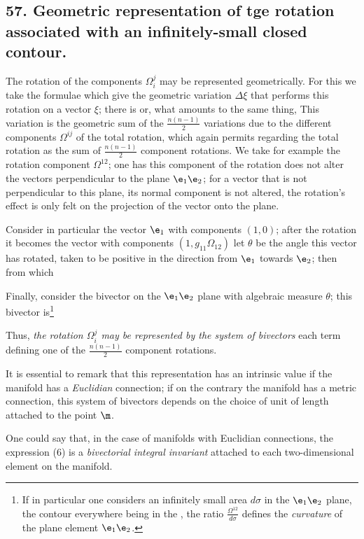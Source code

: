 \subsection*{57. Geometric representation of tge rotation associated with an infinitely-small closed contour.}

The rotation of the components $\Omega_i^j$ may be represented geometrically. For this we take the formulae which give the geometric variation $\Delta\xi$ that performs this rotation on a vector $\xi$; there is
or, what amounts to the same thing,
This variation is the geometric sum of the $\frac{n(n-1)}{2}$ variations due to the different components $\Omega^{ij}$ of the total rotation, which again permits regarding the total rotation as the sum of $\frac{n(n-1)}{2}$ component rotations. We take for example the rotation component $\Omega^{12}$; one has
this component of the rotation does not alter the vectors perpendicular to the plane $\e_1\e_2$; for a vector that is not perpendicular to this plane, its normal component is not altered, the rotation's effect is only felt on the projection of the vector onto the plane.

Consider in particular the vector $\e_1$ with components $(1,0)$; after the rotation it becomes the vector with components $(1, g_{11}\Omega_{12})$
let $\theta$ be the angle this vector has rotated, taken to be positive in the direction from $\e_1$ towards $\e_2$; then
from which

Finally, consider the bivector on the $\e_1\e_2$ plane with algebraic measure $\theta$; this bivector is\footnote{If in particular one considers an infinitely small area $d\sigma$ in the $\e_1\e_2$ plane, the contour everywhere being in the , the ratio $\frac{\Omega^{12}}{d\sigma}$ defines the \textit{curvature} of the plane element $\e_1\e_2$.}

Thus, \textit{the rotation $\Omega_i^j$ may be represented by the system of bivectors}
each term defining one of the $\frac{n(n-1)}{2}$ component rotations.

It is essential to remark that this representation has an intrinsic value if the manifold has a \textit{Euclidian} connection; if on the contrary the manifold has a metric connection, this system of bivectors depends on the choice of unit of length attached to the point $\m$.

One could say that, in the case of manifolds with Euclidian connections, the expression (6) is a \textit{bivectorial integral invariant} attached to each two-dimensional element on the manifold.
